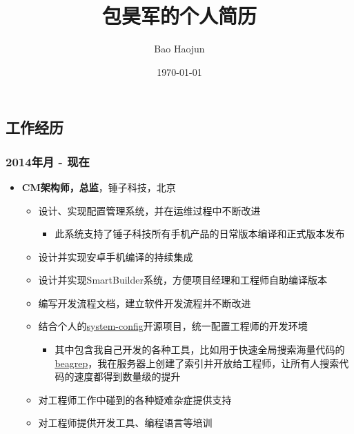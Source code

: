 \documentclass[11pt,dvipdfmx,CJKbookmarks]{article}
\author{Bao Haojun}
\date{\today}
\title{包昊军的个人简历}
\begin{document}
\begin{CJK*}{UTF8}{simsun}

\maketitle

\section{工作经历}
\label{sec:orge8c17e5}
\subsubsection{2014\thinspace 年\thinspace 月 - 现在}
\label{sec:org10e52f9}
\begin{itemize}
\item \textbf{CM\thinspace 架构师，总监}，锤子科技，北京
\begin{itemize}
\item 设计、实现配置管理系统，并在运维过程中不断改进

\begin{itemize}
\item 此系统支持了锤子科技所有手机产品的日常版本编译和正式版本发布
\end{itemize}

\item 设计并实现安卓手机编译的持续集成

\item 设计并实现\thinspace SmartBuilder\thinspace 系统，方便项目经理和工程师自助编译版本

\item 编写开发流程文档，建立软件开发流程并不断改进

\item 结合个人的\thinspace \href{https://github.com/baohaojun/system-config}{system-config}\thinspace 开源项目，统一配置工程师的开发环境

\begin{itemize}
\item 其中包含我自己开发的各种工具，比如用于快速全局搜索海量代码的\thinspace \href{https://github.com/baohaojun/beagrep}{beagrep}，我在服务器上创建了索引并开放给工程师，让所有人搜索代码的速度都得到数量级的提升
\end{itemize}

\item 对工程师工作中碰到的各种疑难杂症提供支持

\item 对工程师提供开发工具、编程语言等培训


\end{itemize}
\end{itemize}
\end{CJK*}
\end{document}
